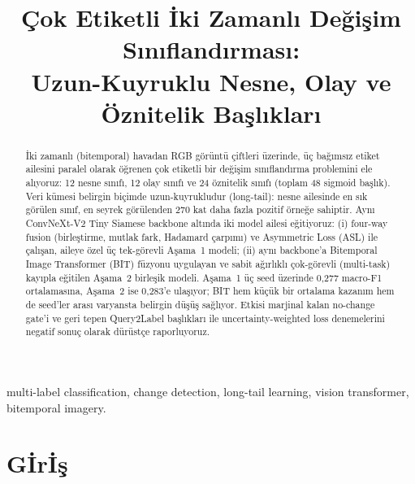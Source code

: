 \documentclass[conference]{IEEEtran}
\begin{document}
\title{Çok Etiketli {\footnotesize İ}ki Zamanlı Değişim Sınıflandırması:\\
  Uzun-Kuyruklu Nesne, Olay ve Öznitelik Başlıkları}

\author{
}

\maketitle

\begin{abstract}
İki zamanlı (bitemporal) havadan RGB görüntü çiftleri üzerinde, üç bağımsız etiket ailesini paralel olarak öğrenen çok etiketli bir değişim sınıflandırma problemini ele alıyoruz: 12 nesne sınıfı, 12 olay sınıfı ve 24 öznitelik sınıfı (toplam 48 sigmoid başlık). Veri kümesi belirgin biçimde uzun-kuyrukludur (long-tail): nesne ailesinde en sık görülen sınıf, en seyrek görülenden 270 kat daha fazla pozitif örneğe sahiptir. Aynı ConvNeXt-V2 Tiny Siamese backbone altında iki model ailesi eğitiyoruz: (i) four-way fusion (birleştirme, mutlak fark, Hadamard çarpımı) ve Asymmetric Loss (ASL) ile çalışan, aileye özel üç tek-görevli Aşama~1 modeli; (ii) aynı backbone'a Bitemporal Image Transformer (BIT) füzyonu uygulayan ve sabit ağırlıklı çok-görevli (multi-task) kayıpla eğitilen Aşama~2 birleşik modeli. Aşama~1 üç seed üzerinde 0{,}277 macro-F1 ortalamasına, Aşama~2 ise 0{,}283'e ulaşıyor; BIT hem küçük bir ortalama kazanım hem de seed'ler arası varyansta belirgin düşüş sağlıyor. Etkisi marjinal kalan no-change gate'i ve geri tepen Query2Label başlıkları ile uncertainty-weighted loss denemelerini negatif sonuç olarak dürüstçe raporluyoruz.
\end{abstract}

\begin{IEEEkeywords}
multi-label classification, change detection, long-tail learning, vision transformer, bitemporal imagery.
\end{IEEEkeywords}

\section{G{\footnotesize İ}r{\footnotesize İ}ş}
\end{document}
